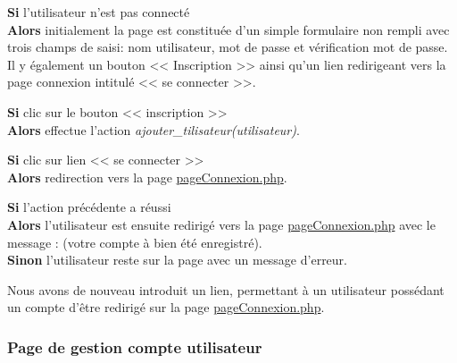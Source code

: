 			\begin{paragraphe}
				\textbf{Si} l'utilisateur n'est pas connecté \\
				\textbf{Alors} initialement la page est constituée d'un simple formulaire non rempli avec trois champs de saisi: nom utilisateur, mot de passe et vérification mot de passe.
				Il y également un bouton << Inscription >> ainsi qu'un lien redirigeant vers la page connexion intitulé << se connecter >>.
			\end{paragraphe}

			\begin{paragraphe}
				\textbf{Si} clic sur le bouton << inscription >> \\
				\textbf{Alors} effectue l'action \emph{ajouter\_tilisateur(utilisateur)}.
			\end{paragraphe}

           \begin{paragraphe}
                \textbf{Si} clic sur lien << se connecter >> \\
                \textbf{Alors} redirection vers la page \underline{pageConnexion.php}.
            \end{paragraphe}

			\begin{paragraphe}
				\textbf{Si} l'action précédente a réussi \\
				\textbf{Alors} l'utilisateur est ensuite redirigé vers la page \underline{pageConnexion.php} avec le message : (votre compte à bien été enregistré). \\
				\textbf{Sinon} l'utilisateur reste sur la page avec un message d'erreur.
			\end{paragraphe}


        \newpage
        
            \begin{paragraphe}
                Nous avons de nouveau introduit un lien, permettant à un utilisateur possédant un compte d'être redirigé sur la page \underline{pageConnexion.php}.
            \end{paragraphe}


    \clearpage

		\subsubsection{Page de gestion compte utilisateur}

